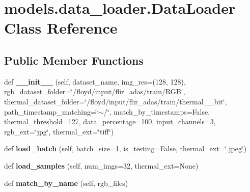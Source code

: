 \hypertarget{classmodels_1_1data__loader_1_1DataLoader}{}\section{models.\+data\+\_\+loader.\+Data\+Loader Class Reference}
\label{classmodels_1_1data__loader_1_1DataLoader}
\subsection*{Public Member Functions}
\begin{DoxyCompactItemize}
\item 
\mbox{\label{classmodels_1_1data__loader_1_1DataLoader_a9f9470bc4f29948bf116639e557631c7}} 
def {\bfseries \+\_\+\+\_\+init\+\_\+\+\_\+} (self, dataset\+\_\+name, img\+\_\+res=(128, 128), rgb\+\_\+dataset\+\_\+folder=\char`\"{}/floyd/input/flir\+\_\+adas/train/R\+GB\char`\"{}, thermal\+\_\+dataset\+\_\+folder=\char`\"{}/floyd/input/flir\+\_\+adas/train/thermal\+\_\+\_\+bit\char`\"{}, path\+\_\+timestamp\+\_\+matching=\char`\"{}$\sim$/\char`\"{}, match\+\_\+by\+\_\+timestamps=False, thermal\+\_\+threshold=127, data\+\_\+percentage=100, input\+\_\+channels=3, rgb\+\_\+ext=\char`\"{}jpg\char`\"{}, thermal\+\_\+ext=\char`\"{}tiff\char`\"{})
\item 
\mbox{\label{classmodels_1_1data__loader_1_1DataLoader_abcf1aab2bc07b88133b64adc3b84029d}} 
def {\bfseries load\+\_\+batch} (self, batch\+\_\+size=1, is\+\_\+testing=False, thermal\+\_\+ext=\char`\"{}.jpeg\char`\"{})
\item 
\mbox{\label{classmodels_1_1data__loader_1_1DataLoader_aeab11859ab3ee802f11b219e57ffec36}} 
def {\bfseries load\+\_\+samples} (self, num\+\_\+imgs=32, thermal\+\_\+ext=None)
\item 
\mbox{\label{classmodels_1_1data__loader_1_1DataLoader_a670a3ec63852f7fb2ec609b182d68c10}} 
def {\bfseries match\+\_\+by\+\_\+name} (self, rgb\+\_\+files)
\item 
\mbox{\label{classmodels_1_1data__loader_1_1DataLoader_a382d3735d488345c5124ee85d943ee25}} 

\end{DoxyCompactItemize}

